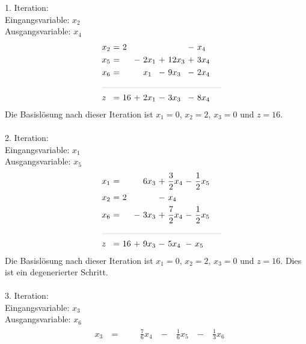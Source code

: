 \documentclass [a4paper,11pt]{article}
\begin{document}
\begin{enumerate}
        1. Iteration:\\
        Eingangsvariable: $x_2$\\
        Ausgangsvariable: $x_4$
        \begin{align*}
        \begin{alignedat}{6}
        & x_2 &\ = &\  2 &    &       &    &        &\ - &\   x_4 \\
        & x_5 &\ = &     &\ - &\ 2x_1 &\ + &\ 12x_3 &\ + &\  3x_4 \\
        & x_6 &\ = &     &    &\  x_1 &\ - &\  9x_3 &\ - &\  2x_4 \\
        &\rlap{\rule{5cm}{.1pt}} &&&&&&&&\\
        & z   &\ = &\ 16 &\ + &\ 2x_1 &\ - &\  3x_3 &\ - &\  8x_4 
        \end{alignedat}
        \end{align*}
        Die Basislösung nach dieser Iteration ist $x_1 = 0$, $x_2 = 2$, $x_3 = 0$ und $z = 16$.\\
        \\
        2. Iteration:\\
        Eingangsvariable: $x_1$\\
        Ausgangsvariable: $x_5$
        \begin{align*}
        \begin{alignedat}{6}
        & x_1 &\ = &     &    &\ 6x_3 &\ + &\ \frac{3}{2}x_4 &\ - &\ \frac{1}{2} x_5 \\
        & x_2 &\ = &\  2 &    &       &\ - &\   x_4 &    & \\
        & x_6 &\ = &     &\ - &\ 3x_3 &\ + &\ \frac{7}{2}x_4 &\ - &\ \frac{1}{2}x_5 \\
        &\rlap{\rule{5cm}{.1pt}} &&&&&&&&\\
        & z   &\ = &\ 16 &\ + &\ 9x_3 &\ - &\  5x_4 &\ - &\  x_5
        \end{alignedat}
        \end{align*}
        Die Basislösung nach dieser Iteration ist $x_1 = 0$, $x_2 = 2$, $x_3 = 0$ und $z = 16$. Dies ist ein degenerierter Schritt.\\
        \\
        3. Iteration:\\
        Eingangsvariable: $x_3$\\
        Ausgangsvariable: $x_6$
        \begin{align*}
        \begin{alignedat}{6}
        & x_3 &\ = &     &    &\  \frac{7}{6}x_4 &\ - &\ \frac{1}{6}x_5 &\ - &\ \frac{1}{3} x_6 \\

\end{alignedat}
\end{align*}
\end{enumerate}
\end{document}
